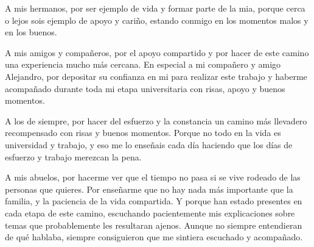 \vspace{0.5cm}

A mis hermanos, por ser ejemplo de vida y formar parte de la mia, porque cerca o lejos
sois ejemplo de apoyo y cariño, estando conmigo en los momentos malos y en los buenos.

\vspace{0.5cm}

A mis amigos y compañeros, por el apoyo compartido y por hacer de este camino una experiencia mucho más cercana. En especial a
mi compañero y amigo Alejandro, por depositar su confianza en mi para realizar este trabajo y haberme acompañado
durante toda mi etapa universitaria con risas, apoyo y buenos momentos.
\vspace{0.5cm}

A los de siempre, por hacer del esfuerzo y la constancia un camino más llevadero recompensado con risas y buenos momentos. Porque 
no todo en la vida es universidad y trabajo, y eso me lo enseñais cada día haciendo que los días
de esfuerzo y trabajo merezcan la pena.

\vspace{0.5cm}

A mis abuelos, por hacerme ver que el tiempo no pasa si se vive rodeado de las personas que quieres.
Por enseñarme que no hay nada más importante que la familia, y la paciencia de la vida compartida.
Y porque han estado presentes en cada etapa de este camino, escuchando pacientemente mis explicaciones 
sobre temas que probablemente les resultaran ajenos. Aunque no siempre entendieran de qué hablaba, siempre consiguieron que me sintiera escuchado y acompañado.
\clearpage
